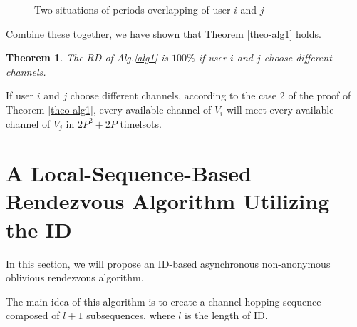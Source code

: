 \documentclass[10pt, conference, letterpaper]{IEEEtran}
\newtheorem{theorem}{Theorem}
\begin{document}
\begin{IEEEproof}
\begin{figure}
\centering
{}
\caption{Two situations of periods overlapping of user $i$ and $j$}
\label{sit_period}
\end{figure}

Combine these together, we have shown that Theorem \ref{theo-alg1} holds.
\end{IEEEproof}


\begin{theorem}
The RD of Alg.\ref{alg1} is $100\%$ if user $i$ and $j$ choose different channels.
\end{theorem}

\begin{IEEEproof}
If user $i$ and $j$ choose different channels, according to the case 2 of the proof of Theorem \ref{theo-alg1}, every available channel of $V_i$ will meet every available channel of $V_j$ in $2P^2+2P$ timelsots.
\end{IEEEproof}




\section{A Local-Sequence-Based Rendezvous Algorithm Utilizing the ID}
In this section, we will propose an ID-based asynchronous non-anonymous oblivious rendezvous algorithm.



The main idea of this algorithm is to create a channel hopping sequence composed of $l + 1$ subsequences, where $l$ is the length of ID.
\end{document}
